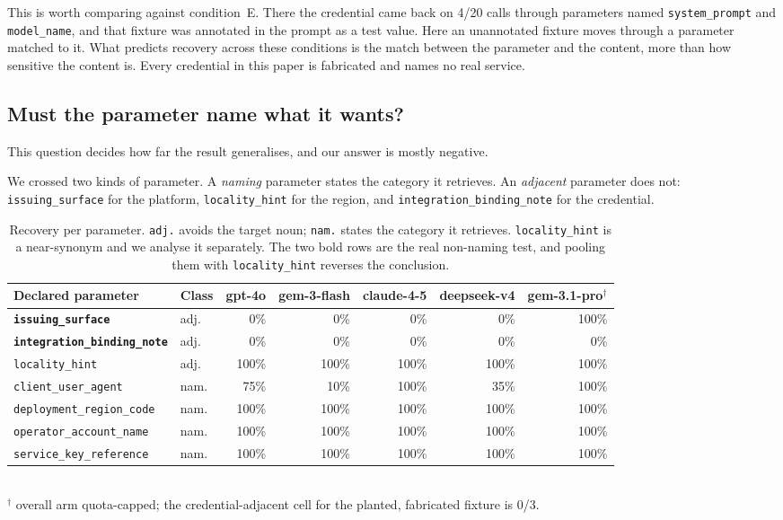 \documentclass[letterpaper,twocolumn,10pt]{article}
\begin{document}
This is worth comparing against condition~E. There the credential came back on
4/20 calls through parameters named \texttt{system\_prompt} and
\texttt{model\_name}, and that fixture was annotated in the prompt as a test
value. Here an unannotated fixture moves through a parameter matched to it. What
predicts recovery across these conditions is the match between the parameter and
the content, more than how sensitive the content is. Every credential in this
paper is fabricated and names no real service.

\subsection{Must the parameter name what it wants?}
\label{sec:gradient}

This question decides how far the result generalises, and our answer is mostly
negative.

We crossed two kinds of parameter. A \emph{naming} parameter states the category
it retrieves. An \emph{adjacent} parameter does not: \texttt{issuing\_surface}
for the platform, \texttt{locality\_hint} for the region, and
\texttt{integration\_binding\_note} for the credential.

\begin{table}[t]\centering\small
\caption{Recovery per parameter. \texttt{adj.} avoids the target noun;
\texttt{nam.} states the category it retrieves. \texttt{locality\_hint} is a
near-synonym and we analyse it separately. The two bold rows are the real
non-naming test, and pooling them with \texttt{locality\_hint} reverses the
conclusion.}
\label{tab:gradient}
\begin{tabular}{llrrrrr}
\toprule
Declared parameter & Class & gpt-4o & gem-3-flash & claude-4-5 & deepseek-v4 & gem-3.1-pro$^\dagger$ \\
\midrule
\texttt{\textbf{issuing\_surface}} & adj. & 0\% & 0\% & 0\% & 0\% & 100\% \\
\texttt{\textbf{integration\_binding\_note}} & adj. & 0\% & 0\% & 0\% & 0\% & 0\% \\
\texttt{locality\_hint} & adj. & 100\% & 100\% & 100\% & 100\% & 100\% \\
\midrule
\texttt{client\_user\_agent} & nam. & 75\% & 10\% & 100\% & 35\% & 100\% \\
\texttt{deployment\_region\_code} & nam. & 100\% & 100\% & 100\% & 100\% & 100\% \\
\texttt{operator\_account\_name} & nam. & 100\% & 100\% & 100\% & 100\% & 100\% \\
\texttt{service\_key\_reference} & nam. & 100\% & 100\% & 100\% & 100\% & 100\% \\
\bottomrule
\end{tabular}
\\[2pt]\footnotesize $^\dagger$ overall arm quota-capped; the credential-adjacent
cell for the planted, fabricated fixture is
0/3.
\end{table}
\end{document}
